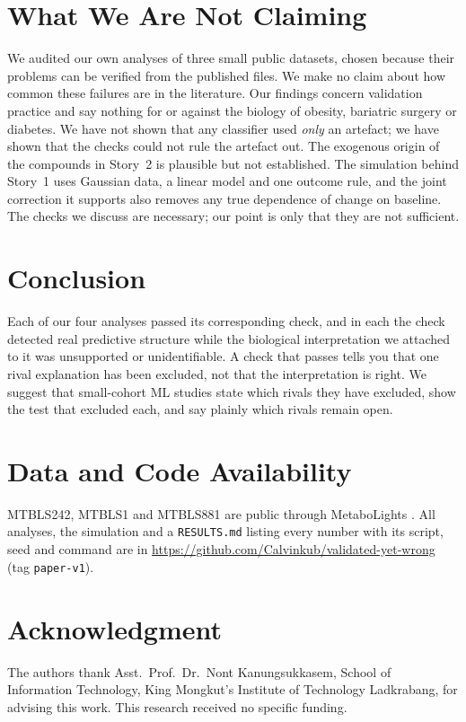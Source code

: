 \documentclass[conference]{IEEEtran}
\begin{document}
\section{What We Are Not Claiming}
\label{sec:limits}

We audited our own analyses of three small public datasets, chosen because
their problems can be verified from the published files. We make no claim
about how common these failures are in the literature. Our findings concern
validation practice and say nothing for or against the biology of obesity,
bariatric surgery or diabetes. We have not shown that any classifier used
\emph{only} an artefact; we have shown that the checks could not rule the
artefact out. The exogenous origin of the compounds in Story~2 is plausible
but not established. The simulation behind Story~1 uses Gaussian data, a
linear model and one outcome rule, and the joint correction it supports also
removes any true dependence of change on baseline. The checks we discuss are
necessary; our point is only that they are not sufficient.

\section{Conclusion}
\label{sec:conclusion}
Each of our four analyses passed its corresponding check, and in each the
check detected real predictive structure while the biological
interpretation we attached to it was unsupported or unidentifiable. A check
that passes tells you that one rival explanation has been excluded, not that
the interpretation is right. We suggest that small-cohort ML studies state
which rivals they have excluded, show the test that excluded each, and say
plainly which rivals remain open.

\section*{Data and Code Availability}
MTBLS242, MTBLS1 and MTBLS881 are public through MetaboLights \cite{haug2020}.
All analyses, the simulation and a \texttt{RESULTS.md} listing every number
with its script, seed and command are in
\url{https://github.com/Calvinkub/validated-yet-wrong} (tag \texttt{paper-v1}).

\section*{Acknowledgment}
The authors thank Asst.\ Prof.\ Dr.\ Nont Kanungsukkasem, School of
Information Technology, King Mongkut's Institute of Technology Ladkrabang, for
advising this work. This research received no specific funding.
\end{document}
